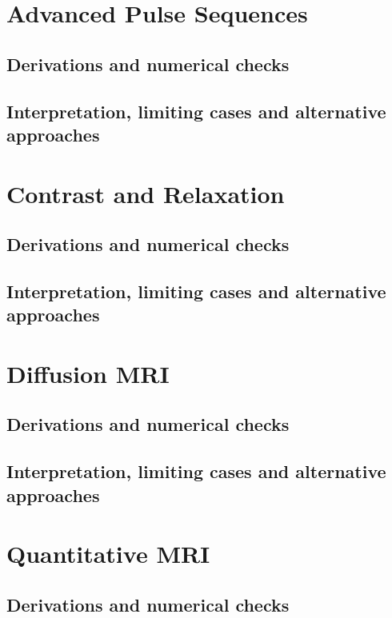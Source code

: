 \section{Advanced Pulse Sequences}
\label{sec:e:advanced-pulse-sequences}
\subsection{Derivations and numerical checks}
\subsection{Interpretation, limiting cases and alternative approaches}
\par\pagebreak[1]

\section{Contrast and Relaxation}
\label{sec:e:contrast-and-relaxation}
\subsection{Derivations and numerical checks}
\subsection{Interpretation, limiting cases and alternative approaches}
\par\pagebreak[1]

\section{Diffusion MRI}
\label{sec:e:diffusion-mri}
\subsection{Derivations and numerical checks}
\subsection{Interpretation, limiting cases and alternative approaches}
\par\pagebreak[1]

\section{Quantitative MRI}
\label{sec:e:quantitative-mri}
\subsection{Derivations and numerical checks}
